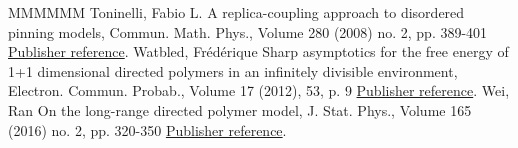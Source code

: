 \documentclass[11pt]{article}
\theoremstyle{definition}
\numberwithin{equation}{section}
\numberwithin{figure}{section}
\numberwithin{table}{section}
\begin{document}
\begin{thebibliography}{MMMMMM}
 Toninelli, Fabio L. A replica-coupling approach to disordered pinning models, Commun. Math. Phys., Volume 280 (2008) no. 2, pp. 389-401 \href{https://ahl.centre-mersenne.org/item/AHL_2020__3__299_0/#cf:Ton08}{Publisher reference}.
 Watbled, Frédérique Sharp asymptotics for the free energy of 1+1 dimensional directed polymers in an infinitely divisible environment, Electron. Commun. Probab., Volume 17 (2012), 53, p. 9 \href{https://ahl.centre-mersenne.org/item/AHL_2020__3__299_0/#cf:Wa12}{Publisher reference}.
 Wei, Ran On the long-range directed polymer model, J. Stat. Phys., Volume 165 (2016) no. 2, pp. 320-350 \href{https://ahl.centre-mersenne.org/item/AHL_2020__3__299_0/#cf:We15}{Publisher reference}.
\end{thebibliography}
\end{document}
